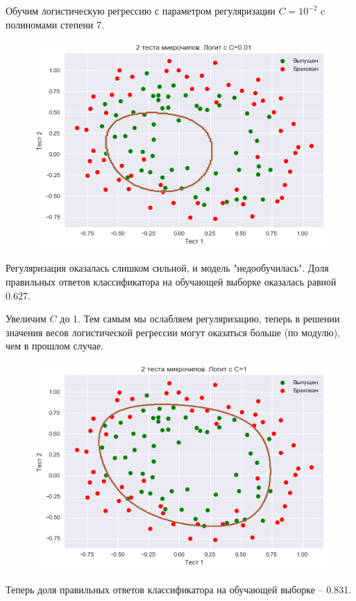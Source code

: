 \documentclass{beamer}
\begin{document}
\begin{frame}[fragile]
Обучим логистическую регрессию с параметром регуляризации $C=10^{-2}$ c полиномами степени 7.
\begin{figure}[h]
\centering
\includegraphics[scale=0.4]{images/test-04.png}
\end{figure}
Регуляризация оказалась слишком сильной, и модель "недообучилась". Доля правильных ответов классификатора на обучающей выборке оказалась равной 0.627.
\end{frame}

\begin{frame}[fragile]
Увеличим $C$ до 1. Тем самым мы ослабляем регуляризацию, теперь в решении значения весов логистической регрессии могут оказаться больше (по модулю), чем в прошлом случае.
\begin{figure}[h]
\centering
\includegraphics[scale=0.4]{images/test-05.png}
\end{figure}
Теперь доля правильных ответов классификатора на обучающей выборке – 0.831.
\end{frame}
\end{document}
